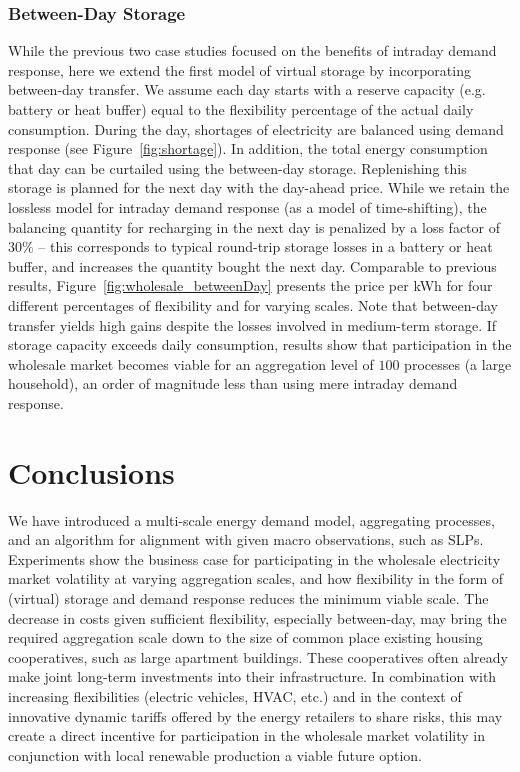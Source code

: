 \documentclass[conference]{IEEEtran}
\begin{document}
\subsubsection{Between-Day Storage}
While the previous two case studies focused on the benefits of intraday demand response, here we extend the first model of virtual storage by incorporating between-day transfer. We assume each day starts with a reserve capacity (e.g. battery or heat buffer) equal to the flexibility percentage of the actual daily consumption. During the day, shortages of electricity are balanced using demand response (see Figure~\ref{fig:shortage}). In addition, the total energy consumption that day can be curtailed using the between-day storage. Replenishing this storage is planned for the next day with the day-ahead price. While we retain the lossless model for intraday demand response (as a model of time-shifting), the balancing quantity for recharging in the next day is penalized by a loss factor of $30\%$ -- this corresponds to typical round-trip storage losses in a battery or heat buffer, and increases the quantity bought the next day. Comparable to previous results, Figure~\ref{fig:wholesale_betweenDay} presents the price per kWh for four different percentages of flexibility and for varying scales. Note that between-day transfer yields high gains despite the losses involved in medium-term storage. If storage capacity exceeds daily consumption, results show that participation in the wholesale market becomes viable for an aggregation level of $100$ processes (a large household), an order of magnitude less than using mere intraday demand response.




\section{Conclusions}
\label{sec:Conclusion}

We have introduced a multi-scale energy demand model, aggregating processes, and an algorithm for alignment with given macro observations, such as SLPs. Experiments show the business case for participating in the wholesale electricity market volatility at varying aggregation scales, and how flexibility in the form of (virtual) storage and demand response reduces the minimum viable scale. The decrease in costs given sufficient flexibility, especially between-day, may bring the required aggregation scale down to the size of common place existing housing cooperatives, such as large apartment buildings. These cooperatives often already make joint long-term investments into their infrastructure. In combination with increasing flexibilities (electric vehicles, HVAC, etc.) and in the context of innovative dynamic tariffs offered by the energy retailers to share risks, this may create a direct incentive for participation in the wholesale market volatility in conjunction with local renewable production a viable future option.
\end{document}
